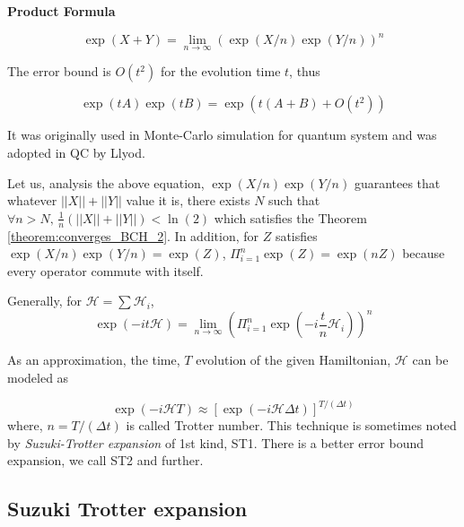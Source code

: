 \begin{theorem} \textbf{Product Formula}
    
    \begin{equation*}
        \label{eq:product_formula}
        \exp(X + Y) = \lim_{n \rightarrow \infty} \left(\exp(X/n) \exp(Y/n)\right)^{n} 
    \end{equation*}
\end{theorem} 

The error bound is $O(t^2)$ for the evolution time $t$, thus

\begin{equation}
    \exp(tA) \exp(tB) = \exp(t(A+B) + O(t^2))
\end{equation}

It was originally used in Monte-Carlo simulation for quantum system 
and was adopted in QC by Llyod\cite{lloyd_universal_1996}.

Let us, analysis the above equation, $\exp(X/n) \exp(Y/n)$ guarantees that whatever $||X||+||Y||$ value it is, there exists $N$ such that 
$\forall n >N, \, \frac{1}{n}(||X|| + ||Y||) < \ln(2)$ which satisfies the Theorem \ref{theorem:converges_BCH_2}.
In addition, for $Z$ satisfies $\exp(X/n)\exp(Y/n) = \exp(Z)$, $\Pi_{i=1}^n \exp(Z) = \exp(n Z)$ because every operator commute with itself.

Generally, for $\mathcal{H} = \sum \mathcal{H}_i$,
\begin{equation}
    \exp(- i t \mathcal{H}) = \lim_{n \rightarrow \infty} \left( \Pi_{i=1}^n \exp(-i \frac{t}{n} \mathcal{H}_i) \right)^n
\end{equation}

As an approximation, the time, $T$ evolution of the given Hamiltonian, $\mathcal{H}$ can be modeled as

\begin{equation}
    \exp(-i \mathcal{H} T) \approx [\exp(-i \mathcal{H} \Delta t)]^{T/(\Delta t)}
\end{equation}
where, $n= T/(\Delta t)$ is called Trotter number.
This technique is sometimes noted by \textit{Suzuki-Trotter expansion} of 1st kind, ST1.
There is a better error bound expansion, we call ST2 and further.

\subsection{Suzuki Trotter expansion}

